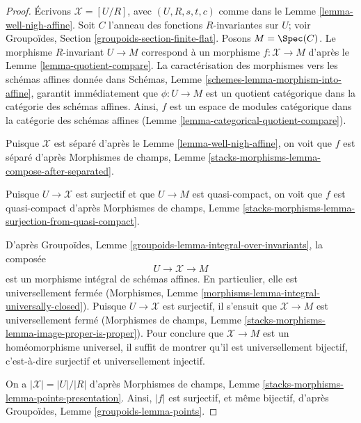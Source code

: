 \begin{proof}
Écrivons $\mathcal{X} = [U/R]$, avec $(U, R, s, t, c)$ comme dans le
Lemme \ref{lemma-well-nigh-affine}. Soit $C$ l'anneau des
fonctions $R$-invariantes sur $U$; voir
Groupoïdes, Section \ref{groupoids-section-finite-flat}.
Posons $M = \Spec(C)$. Le morphisme $R$-invariant
$U \to M$ correspond à un morphisme $f : \mathcal{X} \to M$ d'après le
Lemme \ref{lemma-quotient-compare}.
La caractérisation des morphismes vers les schémas affines donnée dans
Schémas, Lemme \ref{schemes-lemma-morphism-into-affine},
garantit immédiatement que $\phi : U \to M$ est un quotient
catégorique dans la catégorie des schémas affines. Ainsi, $f$ est un
espace de modules catégorique dans la catégorie des schémas affines
(Lemme \ref{lemma-categorical-quotient-compare}).

\medskip\noindent
Puisque $\mathcal{X}$ est séparé d'après le Lemme \ref{lemma-well-nigh-affine},
on voit que $f$ est séparé d'après Morphismes de champs, Lemme
\ref{stacks-morphisms-lemma-compose-after-separated}.

\medskip\noindent
Puisque $U \to \mathcal{X}$ est surjectif et que $U \to M$ est quasi-compact,
on voit que $f$ est quasi-compact d'après Morphismes de champs, Lemme
\ref{stacks-morphisms-lemma-surjection-from-quasi-compact}.

\medskip\noindent
D'après Groupoïdes, Lemme \ref{groupoids-lemma-integral-over-invariants},
la composée
$$
U \to \mathcal{X} \to M
$$
est un morphisme intégral de schémas affines. En particulier, elle est
universellement fermée
(Morphismes, Lemme \ref{morphisms-lemma-integral-universally-closed}).
Puisque $U \to \mathcal{X}$ est surjectif, il s'ensuit que $\mathcal{X} \to M$
est universellement fermé (Morphismes de champs, Lemme
\ref{stacks-morphisms-lemma-image-proper-is-proper}).
Pour conclure que $\mathcal{X} \to M$ est un homéomorphisme universel,
il suffit de montrer qu'il est universellement bijectif, c'est-à-dire
surjectif et universellement injectif.

\medskip\noindent
On a $|\mathcal{X}| = |U|/|R|$ d'après
Morphismes de champs, Lemme \ref{stacks-morphisms-lemma-points-presentation}.
Ainsi, $|f|$ est surjectif, et même bijectif,
d'après Groupoïdes, Lemme \ref{groupoids-lemma-points}.


\end{proof}
